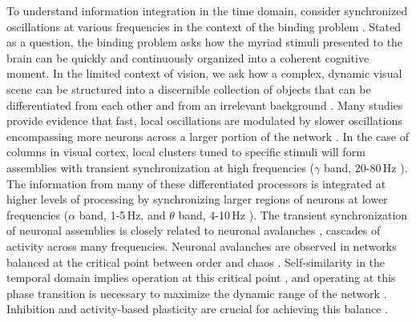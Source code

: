 \documentclass[twocolumn]{article}
\begin{document}
To understand information integration in the time domain, consider synchronized oscillations at various frequencies in the context of the binding problem \cite{ro1999,tr1999}. Stated as a question, the binding problem asks how the myriad stimuli presented to the brain can be quickly and continuously organized into a coherent cognitive moment. In the limited context of vision, we ask how a complex, dynamic visual scene can be structured into a discernible collection of objects that can be differentiated from each other and from an irrelevant background \cite{rede1999}. Many studies provide evidence that fast, local oscillations are modulated by slower oscillations encompassing more neurons across a larger portion of the network \cite{vala2001,sase2001,enfr2001,lued1997,stsa2000,budr2004,bu2006,fr2015}. In the case of columns in visual cortex, local clusters tuned to specific stimuli will form assemblies with transient synchronization at high frequencies ($\gamma$ band, 20-80\,Hz \cite{budr2004}). The information from many of these differentiated processors is integrated at higher levels of processing by synchronizing larger regions of neurons at lower frequencies ($\alpha$ band, 1-5\,Hz, and $\theta$ band, 4-10\,Hz \cite{stsa2000,budr2004}). The transient synchronization of neuronal assemblies is closely related to neuronal avalanches \cite{be2007,shya2009}, cascades of activity across many frequencies. Neuronal avalanches are observed in networks balanced at the critical point between order and chaos \cite{be2007,kism2009,shya2009,ch2010,rusp2011}. Self-similarity in the temporal domain implies operation at this critical point \cite{be2007,kism2009,rusp2011}, and operating at this phase transition is necessary to maximize the dynamic range of the network \cite{shya2009}. Inhibition and activity-based plasticity are crucial for achieving this balance \cite{budr2004,bu2006,siqu2007}.  
\end{document}
